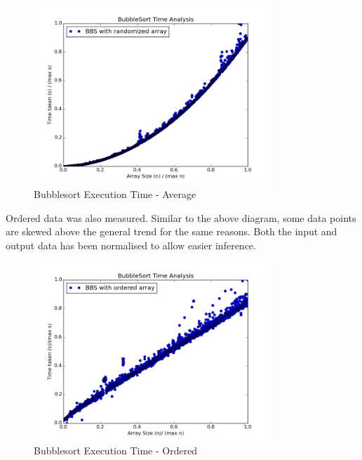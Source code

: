 \documentclass[]{article}
\begin{document}
\begin{figure}[H]\label{MeasuredTime}
	\centering
	\caption{Bubblesort Execution Time - Average}
	\includegraphics[width=0.8\textwidth]{RandomTime.png}
\end{figure}
Ordered data was also measured. Similar to the above diagram, some data points are skewed above the general trend for the same reasons. Both the input and output data has been normalised to allow easier inference.
\begin{figure}[H]\label{MeasuredTimeOrdered}
	\centering
	\caption{Bubblesort Execution Time - Ordered}
	\includegraphics[width=0.8\textwidth]{OrderedTime.png}
\end{figure}


\end{document}
